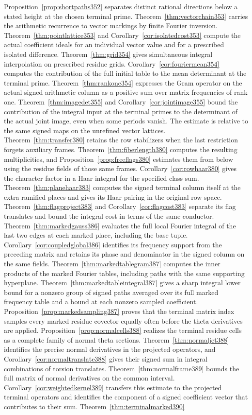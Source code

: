 \documentclass[a4paper,11pt]{article}
\theoremstyle{definition}
\theoremstyle{remark}
\numberwithin{equation}{section}
\begin{document}
Proposition~\ref{prop:shortpaths352} separates distinct rational directions below a stated height at the chosen terminal prime. Theorem~\ref{thm:vectorchain353} carries the arithmetic recurrence to vector markings by finite Fourier inversion. Theorem~\ref{thm:pointlattice353} and Corollary~\ref{cor:isolatedcost353} compute the actual coefficient ideals for an individual vector value and for a prescribed isolated difference. Theorem~\ref{thm:grid354} gives simultaneous integral interpolation on prescribed residue grids. Corollary~\ref{cor:fouriermean354} computes the contribution of the full initial table to the mean determinant at the terminal prime. Theorem~\ref{thm:rankone354} expresses the Gram operator on the actual signed arithmetic column as a positive sum over matrix frequencies of rank one. Theorem~\ref{thm:imagedet355} and Corollary~\ref{cor:jointimage355} bound the contribution of the integral input at the terminal primes to the determinant of the actual joint image, even when some periods vanish. The estimate is relative to the same signed maps on the unrefined vector lattices. Theorem~\ref{thm:transfer380} retains the row stabilizers when the last restriction forgets auxiliary frames. Theorem~\ref{thm:fiberlength380} computes the resulting multiplicities, and Proposition~\ref{prop:freeflags380} estimates them from below using the residue fields of those same frames. Corollary~\ref{cor:rowhaar380} gives the character factor in a Haar integral for the specified class sum. Theorem~\ref{thm:planehaar383} computes the signed terminal column itself at the extra ramified places and gives its Haar pairing in the original row space. Theorem~\ref{thm:flagproject383} and Corollary~\ref{cor:flagcost383} separate its flag translates and bound the integral cost in terms of the same conductor. Theorem~\ref{thm:markedgauss386} evaluates the full local Fourier integral of the last two edges at each marked place, including the base tuple. Corollary~\ref{cor:coupledglobal386} identifies its frequency support from the preceding matrix and retains its phase and denominator in the signed column on the same fields. Theorem~\ref{thm:markedtablegram387} computes the inner products of the marked Fourier tables, including paths with the same supporting hyperplane. Theorem~\ref{thm:markedtableintegral387} gives a sharp integral lower bound for a nonzero group of signed paths averaged over its full marked frequency table and a bound at each nonzero sampled coefficient. Proposition~\ref{prop:markedsampling387} proves that the terminal matrix index samples every marked residue covector equally often before the theta derivatives are applied. Proposition~\ref{prop:normalcells388} realizes the terminal residue cells as a complete family of normal theta sections. Theorem~\ref{thm:normaljet388} identifies the precise normal derivatives in the projected operators, and Corollary~\ref{cor:normaltranslate388} gives their signed sum in integral combinations of torsion translates. Theorem~\ref{thm:normalframe389} bounds the full matrix of normal derivatives on the common interval. Corollary~\ref{cor:weightedkernel389} transfers this estimate to the projected terminal operators and identifies the component of a signed coefficient vector that contributes to their sum. Theorem~\ref{thm:terminalmarked390} 
\end{document}
